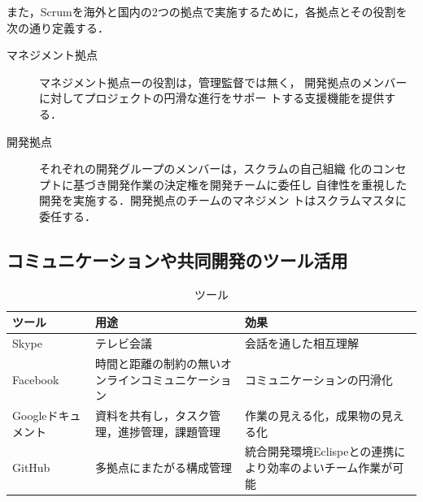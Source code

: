 \documentclass[a4j, 12Q, twocolumn, twoside]{jsarticle}
\begin{document}
また，Scrumを海外と国内の2つの拠点で実施するために，各拠点とその役割を次の通り定義する．

\begin{description}
 \item[マネジメント拠点] マネジメント拠点ーの役割は，管理監督では無く，
	    開発拠点のメンバーに対してプロジェクトの円滑な進行をサポー
	    トする支援機能を提供する．
 \item[開発拠点] それぞれの開発グループのメンバーは，スクラムの自己組織
	    化のコンセプトに基づき開発作業の決定権を開発チームに委任し
	    自律性を重視した開発を実施する．開発拠点のチームのマネジメン
	    トはスクラムマスタに委任する．
\end{description}


\subsection{コミュニケーションや共同開発のツール活用}

\begin{table}[h]
  \caption{ツール}
  \label{tb:Tools}
  \begin{center}
   \small
    \begin{tabular}{|p{}|p{}|p{}|}
      \hline
      ツール & 用途 & 効果 \\
      \hline
      Skype\cite{Skype} & テレビ会議 & 会話を通した相互理解 \\
      Facebook\cite{Facebook} &時間と距離の制約の無いオンラインコミュニケーション &コミュニケーションの円滑化 \\
      Googleドキュメント\cite{googledocument} & 資料を共有し，タスク管理，進捗管理，課題管理 & 作業の見える化，成果物の見える化 \\
      GitHub\cite{GitHub} & 多拠点にまたがる構成管理 &統合開発環境Eclispeとの連携により効率のよいチーム作業が可能 \\
      \hline
    \end{tabular}
  \end{center}
\end{table}
\end{document}

